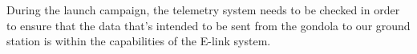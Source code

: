 During the launch campaign, the telemetry system needs to be checked in order to ensure that the data that's intended to be sent from the gondola to our ground station is within the capabilities of the E-link system.

\begin{comment}

\begin{table}[H]
\centering
\begin{tabular}{|m{0.05\textwidth}|m{0.65\textwidth}|>{\centering\arraybackslash}m{0.2\textwidth}|}
\hline
\multicolumn{3}{|l|}{\textbf{BEXUS Electrical Interfaces}}                     \\ \hline
\multicolumn{3}{|l|}{ } \\
\multicolumn{3}{|l|}{E-link Interface: \textbf{Yes}}                           \\ \hline
\multirow{4}{*}{}    & Number of E-link interfaces               & 2            \\ \cline{2-3} 
                     & Data rate - Downlink                      & [\hl{TBD}]     \\ \cline{2-3} 
                     & Data rate - Uplink                        & [\hl{TBD}]     \\ \cline{2-3} 
                     & Interface type (RS232, Ethernet)          & Ethernet    \\ \hline
\multicolumn{3}{|l|}{ } \\
\multicolumn{3}{|l|}{Power system: Gondola power required? \textbf{Yes}}       \\ \hline
\multirow{2}{*}{}    & Peak power (or current) consumption:      & [\hl{TBD}]            \\ \cline{2-3} 
                     & Average power (or current consumption)    & [\hl{TBD}]            \\ \hline
\multicolumn{3}{|l|}{ } \\
\multicolumn{3}{|l|}{Power system: Experiment includes batteries? \textbf{No}} \\ \hline
\end{tabular}
\caption{Electrical Interface Table.}
\label{tab:electrical-interface-table}
\end{table}
\raggedbottom

\end{comment}